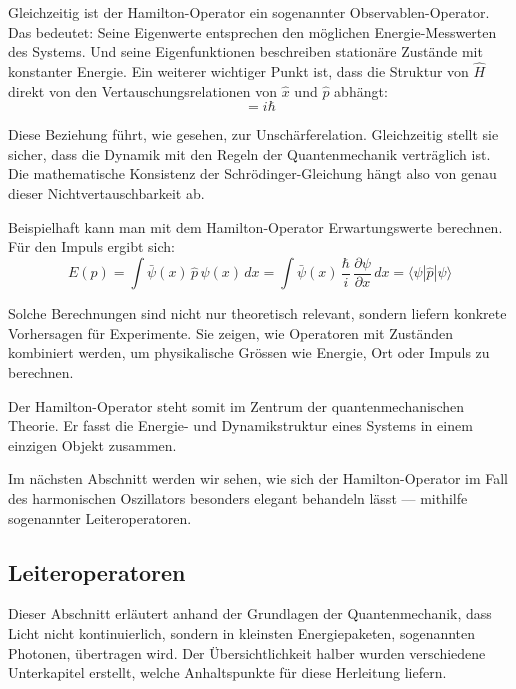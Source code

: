 		Gleichzeitig ist der Hamilton-Operator ein sogenannter Observablen-Operator.
		Das bedeutet:
		Seine Eigenwerte entsprechen den möglichen Energie-Messwerten des Systems.
		Und seine Eigenfunktionen beschreiben stationäre Zustände mit konstanter Energie.
		Ein weiterer wichtiger Punkt ist, dass die Struktur von \( \hat{H} \) direkt von den Vertauschungsrelationen von \( \hat{x} \) und \( \hat{p} \) abhängt:
		\begin{equation}
			[\hat{x}, \hat{p}] = i \hbar
		\end{equation}

		Diese Beziehung führt, wie gesehen, zur Unschärferelation.
		Gleichzeitig stellt sie sicher, dass die Dynamik mit den Regeln der Quantenmechanik verträglich ist.
		Die mathematische Konsistenz der Schrödinger-Gleichung hängt also von genau dieser Nichtvertauschbarkeit ab.

		Beispielhaft kann man mit dem Hamilton-Operator Erwartungswerte berechnen.
		Für den Impuls ergibt sich:
		\begin{equation}
			E(p) = \int \bar{\psi}(x) \, \hat{p} \, \psi(x) \, dx 
			= \int \bar{\psi}(x) \, \frac{\hbar}{i} \, \frac{\partial \psi}{\partial x} \, dx 
			= \langle \psi | \hat{p} | \psi \rangle
		\end{equation}


		Solche Berechnungen sind nicht nur theoretisch relevant, sondern liefern konkrete Vorhersagen für Experimente.
		Sie zeigen, wie Operatoren mit Zuständen kombiniert werden, um physikalische Grössen wie Energie, Ort oder Impuls zu berechnen.

		Der Hamilton-Operator steht somit im Zentrum der quantenmechanischen Theorie.
		Er fasst die Energie- und Dynamikstruktur eines Systems in einem einzigen Objekt zusammen.

		Im nächsten Abschnitt werden wir sehen, wie sich der Hamilton-Operator im Fall des harmonischen Oszillators besonders elegant behandeln lässt ---
		mithilfe sogenannter Leiteroperatoren.

	\subsection{Leiteroperatoren\label{fourier:subsection:Leiteroperatoren}}
		Dieser Abschnitt erläutert anhand der Grundlagen der Quantenmechanik, dass Licht nicht kontinuierlich, sondern in kleinsten Energiepaketen, sogenannten Photonen, übertragen wird.
		Der Übersichtlichkeit halber wurden verschiedene Unterkapitel erstellt, welche Anhaltspunkte für diese Herleitung liefern.

